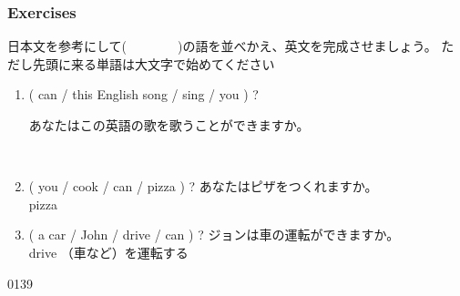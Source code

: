 \documentclass[aspectratio=169,xcolor={dvipsnames,table}]{beamer}
\newcommand{\myaudio}[1]{\href{#1}{\faVolumeUp}}
\begin{document}
\begin{frame}[plain]\frametitle{Exercises}

{\small 日本文を参考にして(~~~~~~~~)の語を並べかえ、英文を完成させましょう。
ただし先頭に来る単語は大文字で始めてください}

\begin{enumerate}
 \item  ( can / this English song / sing / you ) ?\hspace{2\zw}%
\begin{minipage}{15\zw}あなたはこの英語の歌を歌うことができますか。\end{minipage}
\\
 \item ( you / cook / can / pizza ) ?
\hspace{5.3\zw}あなたはピザをつくれますか。\\
%
\hfill{\scriptsize pizza }
 \item ( a car / John / drive / can ) ?\hspace{4.8\zw}%
ジョンは車の運転ができますか。\\
%
\hfill{\scriptsize drive  （車など）を運転する}
\end{enumerate}

\hfill{\tiny 0139}\,{\scriptsize \myaudio{./audio/012_can_08.mp3}}
\end{frame}
\end{document}
